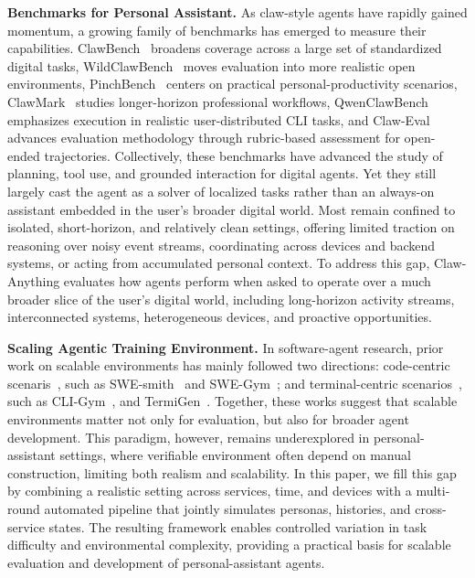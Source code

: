\documentclass{article}
\begin{document}
\textbf{Benchmarks for Personal Assistant.} As claw-style agents have rapidly gained momentum, a growing family of benchmarks has emerged to measure their capabilities. ClawBench~\citep{clawbench} broadens coverage across a large set of standardized digital tasks, WildClawBench~\citep{wildclawbench} moves evaluation into more realistic open environments, PinchBench~\citep{pinchbench} centers on practical personal-productivity scenarios, ClawMark~\citep{clawmark} studies longer-horizon professional workflows, QwenClawBench~\citep{qwenclawbench} emphasizes execution in realistic user-distributed CLI tasks, and Claw-Eval~\citep{claweval} advances evaluation methodology through rubric-based assessment for open-ended trajectories. Collectively, these benchmarks have advanced the study of planning, tool use, and grounded interaction for digital agents. Yet they still largely cast the agent as a solver of localized tasks rather than an always-on assistant embedded in the user's broader digital world. Most remain confined to isolated, short-horizon, and relatively clean settings, offering limited traction on reasoning over noisy event streams, coordinating across devices and backend systems, or acting from accumulated personal context. To address this gap, Claw-Anything evaluates how agents perform when asked to operate over a much broader slice of the user's digital world, including long-horizon activity streams, interconnected systems, heterogeneous devices, and proactive opportunities.

\textbf{Scaling Agentic Training Environment.} In software-agent research, prior work on scalable environments has mainly followed two directions: code-centric scenaris~\citep{swebench,featurebench}, such as SWE-smith~\citep{swesmith} and SWE-Gym~\citep{swe-gym}; and terminal-centric scenarios~\citep{terminalbench2026}, such as CLI-Gym~\citep{cli-gym}, and TermiGen~\citep{termigen}. Together, these works suggest that scalable environments matter not only for evaluation, but also for broader agent development. This paradigm, however, remains underexplored in personal-assistant settings, where verifiable environment often depend on manual construction, limiting both realism and scalability. In this paper, we fill this gap by combining a realistic setting across services, time, and devices with a multi-round automated pipeline that jointly simulates personas, histories, and cross-service states. The resulting framework enables controlled variation in task difficulty and environmental complexity, providing a practical basis for scalable evaluation and development of personal-assistant agents.
\end{document}
